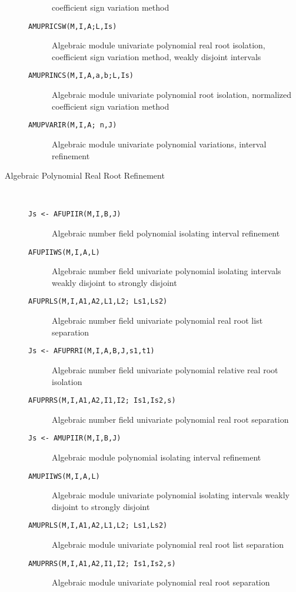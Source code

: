 \begin{description}
\begin{description}
                   coefficient sign variation method
  \item[{\tt AMUPRICSW(M,I,A;L,Is)
}] Algebraic module univariate polynomial real root isolation,
                    coefficient sign variation method, weakly disjoint intervals
  \item[{\tt AMUPRINCS(M,I,A,a,b;L,Is)
}] Algebraic module univariate polynomial root isolation,
                    normalized coefficient sign variation method
  \item[{\tt AMUPVARIR(M,I,A; n,J)
}] Algebraic module univariate polynomial variations, interval
                    refinement
\end{description}

\item[Algebraic Polynomial Real Root Refinement] \ \
\begin{description}
  \item[{\tt Js <- AFUPIIR(M,I,B,J)
}] Algebraic number field polynomial isolating interval 
                  refinement
  \item[{\tt  AFUPIIWS(M,I,A,L) 
}] Algebraic number field univariate polynomial isolating 
                  intervals weakly disjoint to strongly disjoint
  \item[{\tt  AFUPRLS(M,I,A1,A2,L1,L2; Ls1,Ls2) 
}] Algebraic number field univariate polynomial real root list 
                 separation
  \item[{\tt Js <- AFUPRRI(M,I,A,B,J,s1,t1) 
}] Algebraic number field univariate polynomial relative 
                 real root isolation
  \item[{\tt  AFUPRRS(M,I,A1,A2,I1,I2; Is1,Is2,s) 
}] Algebraic number field univariate polynomial real root 
                 separation
  \item[{\tt Js <- AMUPIIR(M,I,B,J)
}] Algebraic module polynomial isolating interval refinement
  \item[{\tt AMUPIIWS(M,I,A,L)
}] Algebraic module univariate polynomial isolating intervals
                   weakly disjoint to strongly disjoint
  \item[{\tt AMUPRLS(M,I,A1,A2,L1,L2; Ls1,Ls2)
}] Algebraic module univariate polynomial real root list 
                  separation
  \item[{\tt AMUPRRS(M,I,A1,A2,I1,I2; Is1,Is2,s)
}] Algebraic module univariate polynomial real root separation
\end{description}


\end{description}
